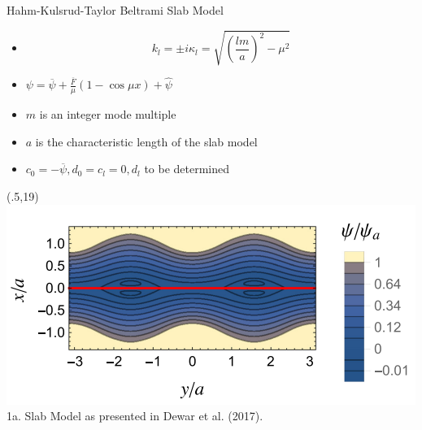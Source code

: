 \documentclass{beamer}
\begin{document}
\begin{frame}[t]
\begin{textblock}{15}
\begin{block}{Hahm-Kulsrud-Taylor Beltrami Slab Model}
\begin{itemize}
    \item \begin{equation}
                k_l = \pm i \kappa_l = \sqrt{\left({\frac{lm}{a}}\right)^2 - \mu^2}
    \end{equation}
\item $\psi=\overline{\psi} + \frac{\overline{F}}{\mu} (1-\cos\mu x) + \hat{\psi}$
    \item $m$ is an integer mode multiple
    \item $a$ is the characteristic length of the slab model
    \item $c_0=-\overline{\psi},d_0=c_l=0,d_l$ to be determined

\end{itemize}

\end{block}
\end{textblock}

\begin{textblock}{15}(.5,19)
    \includegraphics[scale=1]{dewar-boundary-ripples.png} 
    \newline
    1a. Slab Model as presented in Dewar et al. (2017). \cite{dewar2017}
\end{textblock}


\end{frame}
\end{document}
